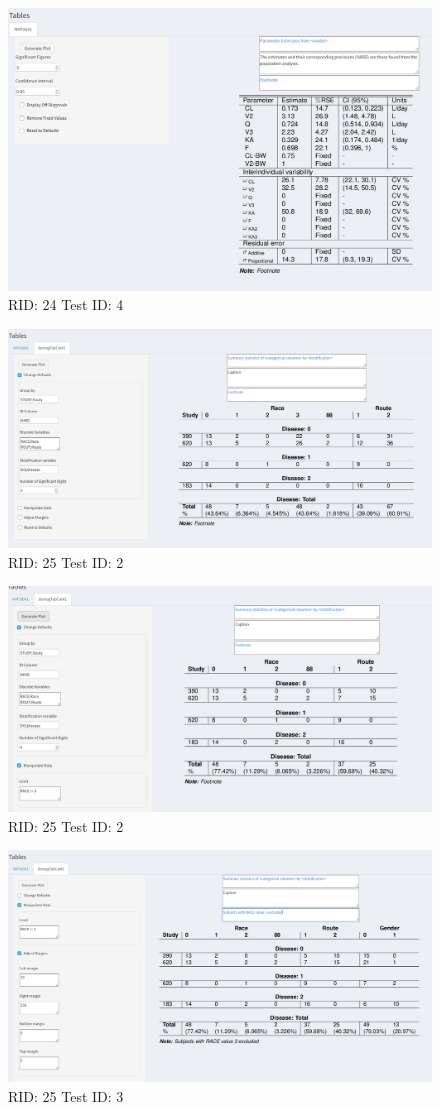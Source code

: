 \documentclass{article}
\begin{document}
\begin{figure}[H]
\includegraphics[width=.8\textwidth]{screencaps/24-4-1.png}
\caption{RID: 24 Test ID: 4}
\end{figure}

\begin{figure}[H]
\includegraphics[width=.8\textwidth]{screencaps/25-2-1.png}
\caption{RID: 25 Test ID: 2}
\end{figure}

\begin{figure}[H]
\includegraphics[width=.8\textwidth]{screencaps/25-2-2.png}
\caption{RID: 25 Test ID: 2}
\end{figure}

\begin{figure}[H]
\includegraphics[width=.8\textwidth]{screencaps/25-3-1.png}
\caption{RID: 25 Test ID: 3}
\end{figure}
\end{document}

